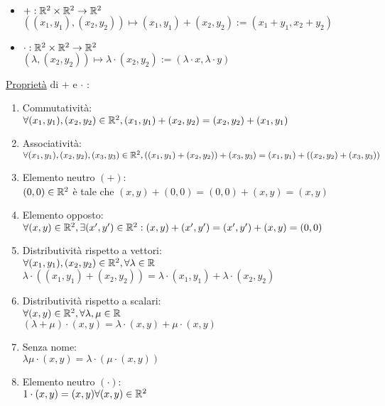 \documentclass{article}
\begin{document}
\begin{itemize}
	\item $+: \mathbb{R}^2\times\mathbb{R}^2\rightarrow\mathbb{R}^2$\\$((x_1,y_1),(x_2,y_2))\mapsto(x_1,y_1)+(x_2,y_2):=(x_1+y_1,x_2+y_2)$
	\item $\cdot: \mathbb{R}^2\times\mathbb{R}^2\rightarrow\mathbb{R}^2$\\\hspace*{-0.3em}$(\lambda,(x_2,y_2))\mapsto\lambda\cdot(x_2,y_2):=(\lambda\cdot x,\lambda\cdot y)$
\end{itemize}
\ul{Proprietà} di $+$ e $\cdot$ :
\begin{enumerate}
	\item Commutatività:\\$\forall(x_1,y_1),(x_2,y_2)\in\mathbb{R}^2, (x_1,y_1)+(x_2,y_2)=(x_2,y_2)+(x_1,y_1)$
	\item Associatività:\\$\forall(x_1,y_1),(x_2,y_2),(x_3,y_3)\in\mathbb{R}^2,\\((x_1,y_1)+(x_2,y_2))+(x_3,y_3)=(x_1,y_1)+((x_2,y_2)+(x_3,y_3))$
	\item Elemento neutro $(+)$:\\$(0,0)\in\mathbb{R}^2$ è tale che $(x,y)+(0,0)=(0,0)+(x,y)=(x,y)$
	\item Elemento opposto:\\$\forall(x,y)\in\mathbb{R}^2,\exists(x',y')\in\mathbb{R}^2:(x,y)+(x',y')=(x',y')+(x,y)=(0,0)$
	\item Distributività rispetto a vettori:\\$\forall(x_1,y_1),(x_2,y_2)\in\mathbb{R}^2,\forall\lambda\in\mathbb{R}$\\$\lambda\cdot((x_1,y_1)+(x_2,y_2))=\lambda\cdot(x_1,y_1)+\lambda\cdot(x_2,y_2)$
	\item Distributività rispetto a scalari:\\$\forall(x,y)\in\mathbb{R}^2,\forall\lambda,\mu\in\mathbb{R}$\\$(\lambda+\mu)\cdot(x,y)=\lambda\cdot(x,y)+\mu\cdot(x,y)$
	\item Senza nome:\\$\lambda\mu\cdot(x,y)=\lambda\cdot(\mu\cdot(x,y))$
	\item Elemento neutro $(\cdot)$:\\$1\cdot(x,y)=(x,y)\forall(x,y)\in\mathbb{R}^2$
\end{enumerate}
\end{document}
